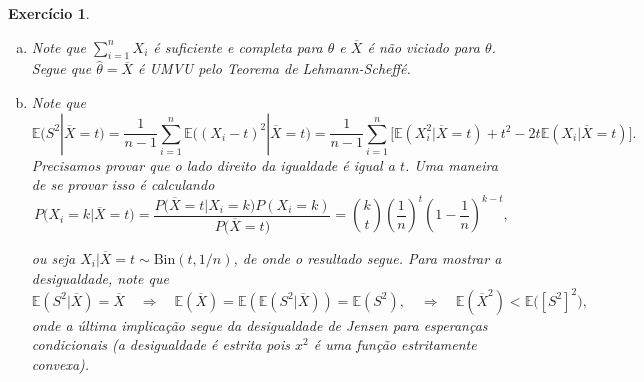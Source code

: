 \documentclass[letter,11pt]{article}
\newtheorem{exer}{Exercício}
\newcommand{\E}{\mathbb {E}}
\newcommand{\sn}{\sum_{i=1}^n}
\newcommand{\hx}{\overline{X}}
\newcommand{\te}{\theta}
\renewcommand{\th}{\hat\theta}
\begin{document}
\begin{exer} \rm 

  \begin{enumerate}[a)]
% 
\item Note que $\sn X_i$ é suficiente e completa para $\te$ e $\hx$ é não viciado para $\te$. Segue que $\th =\hx$ é UMVU pelo Teorema de Lehmann-Scheffé.
\item Note que
\[\E(S^2|\hx=t)=\frac{1}{n-1}\sn\E\big((X_i-t)^2|\hx=t\big)=\frac{1}{n-1}\sn\Big[\E(X_i^2|\hx=t)+t^2-2t\E(X_i|\hx=t)\Big].\]
Precisamos provar que o lado direito da igualdade é igual a $t$. Uma maneira de se provar isso é calculando
\[P\big(X_i=k|\hx=t\big)=\frac{P\big(\hx=t|X_i=k\big)P(X_i=k)}{P\big(\hx=t\big)}=\binom{k}{t}\left(\frac{1}{n}\right)^t\left(1-
\frac{1}{n}\right)^{k-t},\]

ou seja $X_i|\hx=t\sim \mathrm{Bin}(t,1/n)$, de onde o resultado segue. Para mostrar a desigualdade, note que
\[\E(S^2|\hx)=\hx\quad\Longrightarrow\quad\E(\hx)=\E(\E(S^2|\hx))=\E(S^2),\quad\Longrightarrow\quad \E(\hx^2)<\E\big([S^2]^2\big),\]
onde a última implicação segue da desigualdade de Jensen para esperanças condicionais (a desigualdade é estrita pois $x^2$ é uma função estritamente convexa).

  \end{enumerate}

\end{exer}
\end{document}
